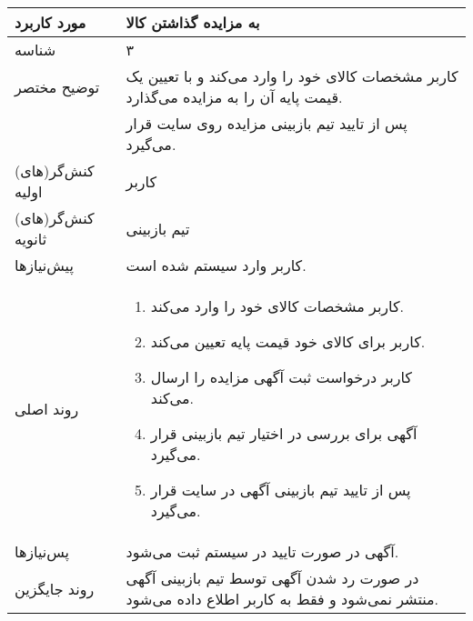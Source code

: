 \documentclass{article}
\begin{document}
\begin{center}
\bgroup
\def\arraystretch{1.5}
\begin{tabular} {|p{}|p{}|}
\hline
 مورد کاربرد & 
 به مزایده گذاشتن کالا
\\ \hline
 شناسه &
۳
\\ \hline
توضیح مختصر &
کاربر مشخصات کالای خود را وارد می‌کند و با تعیین یک قیمت پایه آن را به مزایده می‌گذارد.
\\
&
پس از تایید تیم بازبینی مزایده روی سایت قرار می‌گیرد.
\\ \hline
کنش‌گر(های) اولیه &
کاربر
\\ \hline
کنش‌گر(های) ثانویه &
تیم بازبینی
\\ \hline
پیش‌نیازها &
کاربر وارد سیستم شده است.
\\ \hline
روند اصلی &
\begin{enumerate}
\item
کاربر مشخصات کالای خود را وارد می‌کند.
\item
کاربر برای کالای خود قیمت پایه تعیین می‌کند.
\item
کاربر درخواست ثبت آگهی مزایده را ارسال می‌کند.
\item
آگهی برای بررسی در اختیار تیم بازبینی قرار می‌گیرد.
\item
پس از تایید تیم بازبینی آگهی در سایت قرار می‌گیرد.
\end{enumerate}
\\ \hline
پس‌نیازها &
آگهی در صورت تایید در سیستم ثبت می‌شود.
\\ \hline
روند جایگزین &
در صورت رد شدن آگهی توسط تیم بازبینی آگهی منتشر نمی‌شود و فقط به کاربر اطلاع داده می‌شود. 
\\ \hline
\end{tabular}
\egroup
\end{center}

\newpage
\end{document}
